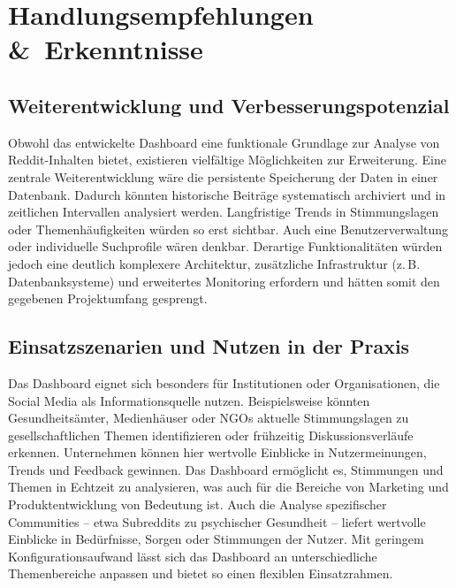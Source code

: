 \section{Handlungsempfehlungen \&~Erkenntnisse}
\label{sec:erkenntnisse}

\subsection{Weiterentwicklung und Verbesserungspotenzial}
Obwohl das entwickelte Dashboard eine funktionale Grundlage zur Analyse von Reddit-Inhalten bietet, existieren vielfältige Möglichkeiten zur Erweiterung. Eine zentrale Weiterentwicklung wäre die persistente Speicherung der Daten in einer Datenbank. Dadurch könnten historische Beiträge systematisch archiviert und in zeitlichen Intervallen analysiert werden. Langfristige Trends in Stimmungslagen oder Themenhäufigkeiten würden so erst sichtbar. Auch eine Benutzerverwaltung oder individuelle Suchprofile wären denkbar. Derartige Funktionalitäten würden jedoch eine deutlich komplexere Architektur, zusätzliche Infrastruktur (z.\,B. Datenbanksysteme) und erweitertes Monitoring erfordern und hätten somit den gegebenen Projektumfang gesprengt.

\subsection{Einsatzszenarien und Nutzen in der Praxis}
Das Dashboard eignet sich besonders für Institutionen oder Organisationen, die Social Media als Informationsquelle nutzen. Beispielsweise könnten Gesundheitsämter, Medienhäuser oder NGOs aktuelle Stimmungslagen zu gesellschaftlichen Themen identifizieren oder frühzeitig Diskussionsverläufe erkennen. Unternehmen können hier wertvolle Einblicke in Nutzermeinungen, Trends und Feedback gewinnen. Das Dashboard ermöglicht es, Stimmungen und Themen in Echtzeit zu analysieren, was auch für die Bereiche von Marketing und Produktentwicklung von Bedeutung ist.
Auch die Analyse spezifischer Communities – etwa Subreddits zu psychischer Gesundheit – liefert wertvolle Einblicke in Bedürfnisse, Sorgen oder Stimmungen der Nutzer. Mit geringem Konfigurationsaufwand lässt sich das Dashboard an unterschiedliche Themenbereiche anpassen und bietet so einen flexiblen Einsatzrahmen.

